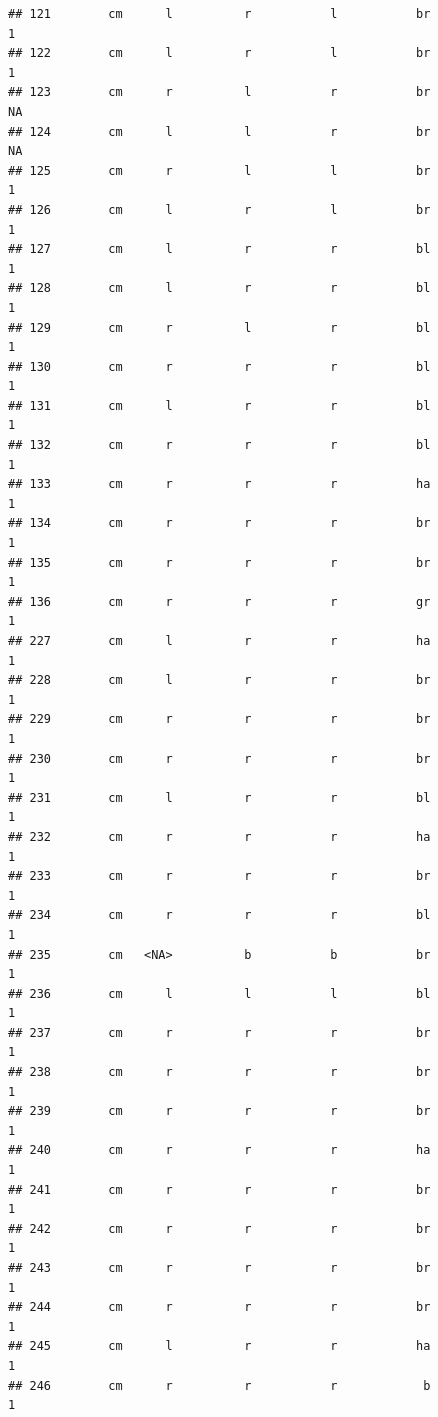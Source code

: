 \documentclass[]{article}
\begin{document}
\begin{verbatim}
## 121        cm      l          r           l           br             1
## 122        cm      l          r           l           br             1
## 123        cm      r          l           r           br            NA
## 124        cm      l          l           r           br            NA
## 125        cm      r          l           l           br             1
## 126        cm      l          r           l           br             1
## 127        cm      l          r           r           bl             1
## 128        cm      l          r           r           bl             1
## 129        cm      r          l           r           bl             1
## 130        cm      r          r           r           bl             1
## 131        cm      l          r           r           bl             1
## 132        cm      r          r           r           bl             1
## 133        cm      r          r           r           ha             1
## 134        cm      r          r           r           br             1
## 135        cm      r          r           r           br             1
## 136        cm      r          r           r           gr             1
## 227        cm      l          r           r           ha             1
## 228        cm      l          r           r           br             1
## 229        cm      r          r           r           br             1
## 230        cm      r          r           r           br             1
## 231        cm      l          r           r           bl             1
## 232        cm      r          r           r           ha             1
## 233        cm      r          r           r           br             1
## 234        cm      r          r           r           bl             1
## 235        cm   <NA>          b           b           br             1
## 236        cm      l          l           l           bl             1
## 237        cm      r          r           r           br             1
## 238        cm      r          r           r           br             1
## 239        cm      r          r           r           br             1
## 240        cm      r          r           r           ha             1
## 241        cm      r          r           r           br             1
## 242        cm      r          r           r           br             1
## 243        cm      r          r           r           br             1
## 244        cm      r          r           r           br             1
## 245        cm      l          r           r           ha             1
## 246        cm      r          r           r            b             1

\end{verbatim}
\end{document}
